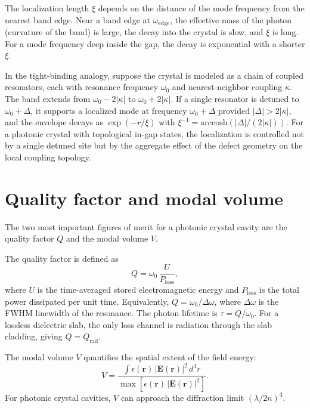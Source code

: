 \documentclass[12pt,a4paper,oneside]{book}
\theoremstyle{plain}
\theoremstyle{definition}
\theoremstyle{remark}
\newcommand{\vb}[1]{\bm{#1}}
\newcommand{\Efield}{\vb{E}}
\newcommand{\eps}{\epsilon}
\newcommand{\om}{\omega}
\newcommand{\rvec}{\vb{r}}
\begin{document}
The localization length $\xi$ depends on the distance of the mode frequency from the nearest band edge. Near a band edge at $\om_\mathrm{edge}$, the effective mass of the photon (curvature of the band) is large, the decay into the crystal is slow, and $\xi$ is long. For a mode frequency deep inside the gap, the decay is exponential with a shorter $\xi$.

In the tight-binding analogy, suppose the crystal is modeled as a chain of coupled resonators, each with resonance frequency $\om_0$ and nearest-neighbor coupling $\kappa$. The band extends from $\om_0 - 2|\kappa|$ to $\om_0 + 2|\kappa|$. If a single resonator is detuned to $\om_0 + \Delta$, it supports a localized mode at frequency $\om_0 + \Delta$ provided $|\Delta| > 2|\kappa|$, and the envelope decays as $\exp(-r/\xi)$ with $\xi^{-1} = \mathrm{arccosh}(|\Delta|/(2|\kappa|))$. For a photonic crystal with topological in-gap states, the localization is controlled not by a single detuned site but by the aggregate effect of the defect geometry on the local coupling topology.

\section{Quality factor and modal volume}
\label{sec:qv}

The two most important figures of merit for a photonic crystal cavity are the quality factor $Q$ and the modal volume $V$.

The quality factor is defined as
\begin{equation}
  Q = \om_0\,\frac{U}{P_\mathrm{loss}},
  \label{eq:q-factor}
\end{equation}
where $U$ is the time-averaged stored electromagnetic energy and $P_\mathrm{loss}$ is the total power dissipated per unit time. Equivalently, $Q = \om_0/\Delta\om$, where $\Delta\om$ is the FWHM linewidth of the resonance. The photon lifetime is $\tau = Q/\om_0$. For a lossless dielectric slab, the only loss channel is radiation through the slab cladding, giving $Q = Q_\mathrm{rad}$.

The modal volume $V$ quantifies the spatial extent of the field energy:
\begin{equation}
  V = \frac{\int \eps(\rvec)\,|\Efield(\rvec)|^2\,d^3r}{\max\left[\eps(\rvec)\,|\Efield(\rvec)|^2\right]}.
  \label{eq:modal-volume}
\end{equation}
For photonic crystal cavities, $V$ can approach the diffraction limit $(\lambda/2n)^3$.
\end{document}
